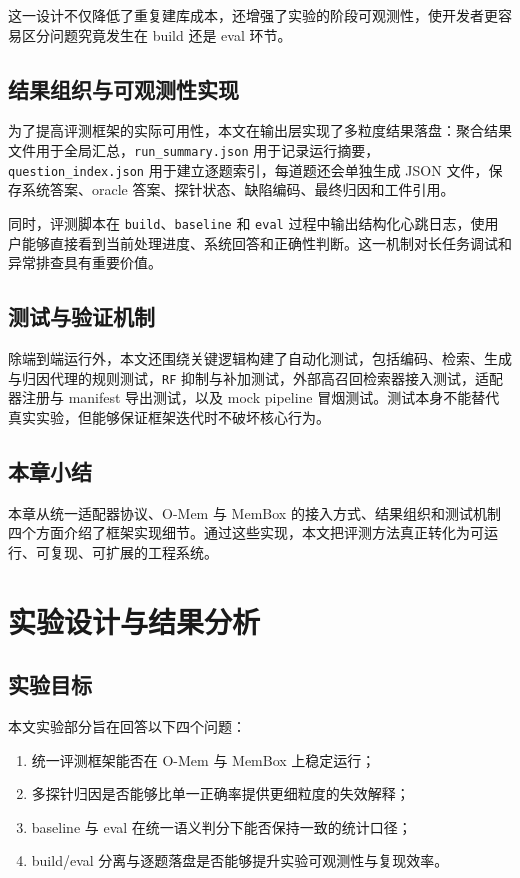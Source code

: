 这一设计不仅降低了重复建库成本，还增强了实验的阶段可观测性，使开发者更容易区分问题究竟发生在 build 还是 eval 环节。

\section{结果组织与可观测性实现}

为了提高评测框架的实际可用性，本文在输出层实现了多粒度结果落盘：聚合结果文件用于全局汇总，\texttt{run\_summary.json} 用于记录运行摘要，\texttt{question\_index.json} 用于建立逐题索引，每道题还会单独生成 JSON 文件，保存系统答案、oracle 答案、探针状态、缺陷编码、最终归因和工件引用。

同时，评测脚本在 \texttt{build}、\texttt{baseline} 和 \texttt{eval} 过程中输出结构化心跳日志，使用户能够直接看到当前处理进度、系统回答和正确性判断。这一机制对长任务调试和异常排查具有重要价值。

\section{测试与验证机制}

除端到端运行外，本文还围绕关键逻辑构建了自动化测试，包括编码、检索、生成与归因代理的规则测试，\texttt{RF} 抑制与补加测试，外部高召回检索器接入测试，适配器注册与 manifest 导出测试，以及 mock pipeline 冒烟测试。测试本身不能替代真实实验，但能够保证框架迭代时不破坏核心行为。

\section{本章小结}

本章从统一适配器协议、O-Mem 与 MemBox 的接入方式、结果组织和测试机制四个方面介绍了框架实现细节。通过这些实现，本文把评测方法真正转化为可运行、可复现、可扩展的工程系统。

\chapter{实验设计与结果分析}

\section{实验目标}

本文实验部分旨在回答以下四个问题：

\begin{enumerate}
    \item 统一评测框架能否在 O-Mem 与 MemBox 上稳定运行；
    \item 多探针归因是否能够比单一正确率提供更细粒度的失效解释；
    \item baseline 与 eval 在统一语义判分下能否保持一致的统计口径；
    \item build/eval 分离与逐题落盘是否能够提升实验可观测性与复现效率。
\end{enumerate}


